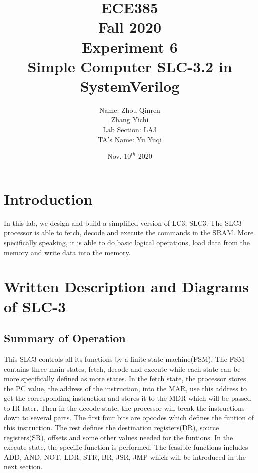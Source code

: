 \documentclass[12pt]{article}
\title{
    \textbf{\Huge ECE385} \\
    \huge Fall 2020 \\
    \huge Experiment 6 \\[120pt]
    \textbf{\Huge Simple Computer SLC-3.2 in SystemVerilog} \\[120pt]
    }
\author{
    \large Name: Zhou Qinren \\ 
            \quad\qquad Zhang Yichi \\
    \large Lab Section: LA3 \\
    \large TA's Name: Yu Yuqi
    }
\date{Nov. $10^{th}$ 2020}
\begin{document}
\setlength{\parindent}{0pt}
\maketitle
\newpage

\section{Introduction}
In this lab, we design and build a simplified version of LC3, SLC3. The SLC3 processor is able to fetch, decode and execute the commands in the SRAM. More specifically speaking, it is able to do basic logical operations, load data from the memory and write data into the memory.

\section{Written Description and Diagrams of SLC-3}
\subsection{Summary of Operation}
This SLC3 controls all its functions by a finite state machine(FSM). The FSM contains three main states, fetch, decode and execute while each state can be more specifically defined as more states. In the fetch state, the processor stores the PC value, the address of the instruction, into the MAR, use this address to get the corresponding instruction and stores it to the MDR which will be passed to IR later. Then in the decode state, the processor will break the instructions down to several parts. The first four bits are opcodes which defines the funtion of this instruction. The rest defines the destination registers(DR), source registers(SR), offsets and some other values needed for the funtions. In the execute state, the specific function is performed. The feasible functions includes ADD, AND, NOT, LDR, STR, BR, JSR, JMP which will be introduced in the next section.
\end{document}
